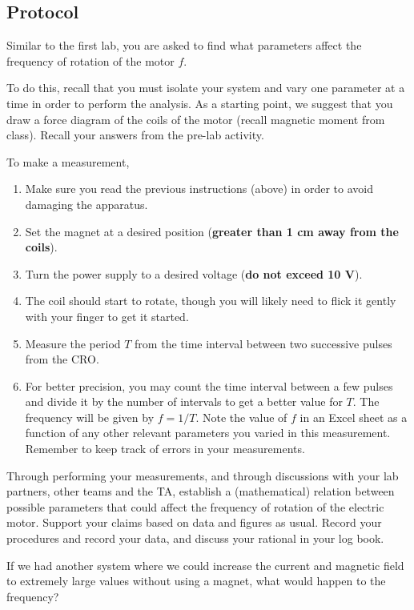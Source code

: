 \documentclass[12pt]{report}
\begin{document}
\subsection{Protocol}
Similar to the first lab, you are asked to find what parameters affect the frequency of rotation of the motor $f$.

To do this, recall that you must isolate your system and vary one parameter at a time in order to perform the analysis. As a starting point, we suggest that you draw a force diagram of the coils of the motor (recall magnetic moment from class). Recall your answers from the pre-lab activity.

To make a measurement,
\begin{enumerate}
\item Make sure you read the previous instructions (above) in order to avoid damaging the apparatus.
\item Set the magnet at a desired position (\textbf{greater than 1 cm away from the coils}).
\item Turn the power supply to a desired voltage (\textbf{do not exceed 10 V}).
\item The coil should start to rotate, though you will likely need to flick it gently with your finger to get it started.
\item Measure the period $T$ from the time interval between two successive pulses from the CRO.
\item For better precision, you may count the time interval between a few pulses and divide it by the number of intervals to get a better value for $T$. The frequency will be given by $f = 1/T$. Note the value of $f$ in an Excel sheet as a function of any other relevant parameters you varied in  this measurement. Remember to keep track of errors in your measurements.
\end{enumerate}

{\color{blue} Through performing your measurements, and through discussions with your lab partners, other teams and the TA, establish a (mathematical) relation between possible parameters that could affect the frequency of rotation of the electric motor. 
Support your claims based on data and figures as usual. Record your procedures and record your data, and discuss your rational in your log book.

If we had another system where we could increase the current and magnetic field to extremely large values without using a magnet, what would happen to the frequency?}
\end{document}
